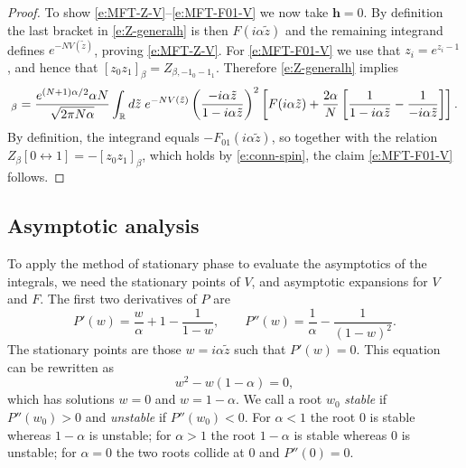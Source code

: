 \documentclass[11pt]{amsart}
\numberwithin{equation}{section}
\numberwithin{theorem}{section}
\newcommand{\V}[1]{\boldsymbol{#1}}
\begin{document}
\begin{proof}
To show \eqref{e:MFT-Z-V}--\eqref{e:MFT-F01-V} we now take $\V{h}=0$.
By definition the last bracket in \eqref{e:Z-generalh} is then
$F(i\alpha\tilde z)$ and the remaining integrand defines
$e^{-NV(\tilde z)}$, proving \eqref{e:MFT-Z-V}.  For
\eqref{e:MFT-F01-V} we use that $z_i = e^{z_i-1}$, and hence that
$[z_0z_1]_{\beta} = Z_{\beta,-1_0-1_1}$. Therefore
\eqref{e:Z-generalh} implies
\begin{align}
  [z_0z_1]_{\beta} =
  \frac{e^{(N+1)\alpha/2}\alpha N}{\sqrt{2\pi N\alpha}}
  \int_{\R} d
  \tilde z  \;
  e^{-NV(\tilde z)} \pa{\frac{-i\alpha \tilde z}{1-i\alpha\tilde z}}^2
  \qa{F(i\alpha\tilde z) + \frac{2\alpha}{N} \qa{ \frac{1}{1-i\alpha\tilde z}-\frac{1}{-i\alpha\tilde z}}
  }.
\end{align}
By definition, the integrand equals $-F_{01}(i\alpha \tilde z)$, so
together with the relation $Z_\beta[0\leftrightarrow 1] = -[z_0z_1]_{\beta}$,
which holds by \eqref{e:conn-spin}, the claim \eqref{e:MFT-F01-V} follows.
\end{proof}


\subsection{Asymptotic analysis} 

To apply the method of stationary phase to evaluate the asymptotics of the integrals,
we need the stationary points of $V$,
and asymptotic expansions for $V$ and $F$.
The first two derivatives of $P$ are
\begin{equation} \label{e:P-derivatives}
  P'(w)
  = \frac{w}{\alpha} + 1 - \frac{1}{1-w}
    ,\qquad
  P''(w)
  = \frac{1}{\alpha} - \frac{1}{(1-w)^2}
  .
\end{equation}
The stationary points are those $w=i\alpha\tilde z$ such that
$P'(w)=0$. 
This equation can be rewritten as %
\begin{equation}
  w^2  - w(1 -\alpha) =0
  ,
\end{equation}
which has solutions $w=0$ and $w=1-\alpha$.
We call a root $w_0$ \emph{stable} if $P''(w_0) >0$ and \emph{unstable} if $P''(w_0)<0$.
For $\alpha<1$ the root $0$ is stable whereas $1-\alpha$ is unstable;
for $\alpha>1$ the root $1-\alpha$ is stable whereas $0$ is unstable;
for $\alpha=0$ the two roots collide at $0$ and $P''(0)=0$.
\end{document}
